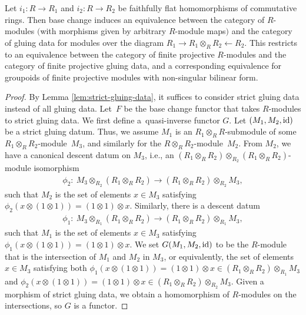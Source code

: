 \begin{lem} \label{lem:faithfully-flat-gluing-data-for-flat-modules}Let $i_1\colon R \to R_1$ and $i_2\colon R \to R_2$ be faithfully flat homomorphisms of commutative rings. Then base change induces an equivalence between the category of $R$-modules $($with morphisms given by arbitrary $R$-module maps$)$ and the category of gluing data for modules over the diagram $R_1 \to R_1 \otimes_{R} R_2 \leftarrow R_2$. This restricts to an equivalence between the category of finite projective $R$-modules and the category of finite projective gluing data, and a corresponding equivalence for groupoids of finite projective modules with non-singular bilinear form.
\end{lem}
\begin{proof}By Lemma \ref{lem:strict-gluing-data}, it suffices to consider strict gluing data instead of all gluing data. Let~$F$ be the base change functor that takes $R$-modules to strict gluing data. We first define a~quasi-inverse functor $G$. Let $(M_1, M_2, {\rm id})$ be a strict gluing datum. Thus, we assume $M_1$ is an $R_1 \otimes_{R} R$-submodule of some $R_1 \otimes_{R} R_2$-module~$M_3$, and similarly for the $R \otimes_{R} R_2$-module~$M_2$. From $M_2$, we have a canonical descent datum on $M_3$, i.e., an $(R_1 \otimes_{R} R_2) \otimes_{R_2} (R_1 \otimes_{R} R_2)$-module isomorphism
\begin{gather*} \phi_2\colon \ M_3 \otimes_{R_2}(R_1 \otimes_{R} R_2) \to (R_1 \otimes_{R} R_2) \otimes_{R_2} M_3, \end{gather*}
such that $M_2$ is the set of elements $x \in M_3$ satisfying $\phi_2(x \otimes (1 \otimes 1)) = (1 \otimes 1) \otimes x$. Similarly, there is a descent datum
\begin{gather*} \phi_1\colon \ M_3 \otimes_{R_1}(R_1 \otimes_{R} R_2) \to (R_1 \otimes_{R} R_2) \otimes_{R_1} M_3, \end{gather*}
such that $M_1$ is the set of elements $x \in M_3$ satisfying $\phi_1(x \otimes (1 \otimes 1)) = (1 \otimes 1) \otimes x$. We set $G(M_1, M_2,{\rm id})$ to be the $R$-module that is the intersection of $M_1$ and $M_2$ in $M_3$, or equivalently, the set of elements $x \in M_3$ satisfying both $\phi_1(x \otimes (1 \otimes 1)) = (1 \otimes 1) \otimes x \in (R_1 \otimes_{R} R_2) \otimes_{R_1} M_3$ and $\phi_2(x \otimes (1 \otimes 1)) = (1 \otimes 1) \otimes x \in (R_1 \otimes_{R} R_2) \otimes_{R_2} M_3$. Given a morphism of strict gluing data, we obtain a homomorphism of $R$-modules on the intersections, so $G$ is a functor.


\end{proof}
